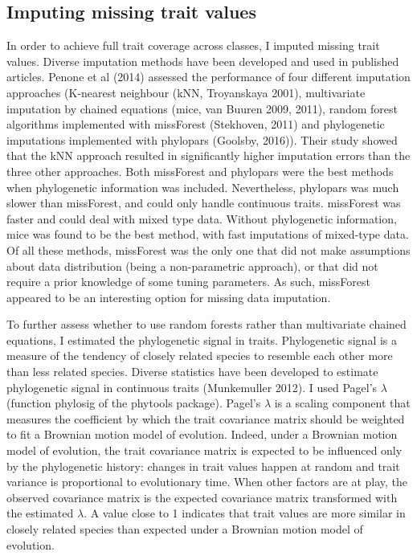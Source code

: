 \subsection{Imputing missing trait values}
In order to achieve full trait coverage across classes, I imputed missing trait values. Diverse imputation methods have been developed and used in published articles. Penone et al (2014) assessed the performance of four different imputation approaches (K-nearest neighbour (kNN, Troyanskaya 2001), multivariate imputation by chained equations (mice, van Buuren 2009, 2011), random forest algorithms implemented with missForest (Stekhoven, 2011) and phylogenetic imputations implemented with phylopars (Goolsby, 2016)). Their study showed that the kNN approach resulted in significantly higher imputation errors than the three other approaches. Both missForest and phylopars were the best methods when phylogenetic information was included. Nevertheless, phylopars was much slower than missForest, and could only handle continuous traits. missForest was faster and could deal with mixed type data. Without phylogenetic information, mice was found to be the best method, with fast imputations of mixed-type data. Of all these methods, missForest was the only one that did not make assumptions about data distribution (being a non-parametric approach), or that did not require a prior knowledge of some tuning parameters. As such, missForest appeared to be an interesting option for missing data imputation.

To further assess whether to use random forests rather than multivariate chained equations, I estimated the phylogenetic signal in traits. Phylogenetic signal is a measure of the tendency of closely related species to resemble each other more than less related species. Diverse statistics have been developed to estimate phylogenetic signal in continuous traits (Munkemuller 2012). I used Pagel's $\lambda$ (function phylosig of the phytools package). Pagel's $\lambda$ is a scaling component that measures the coefficient by which the trait covariance matrix should be weighted to fit a Brownian motion model of evolution. Indeed, under a Brownian motion model of evolution, the trait covariance matrix is expected to be influenced only by the phylogenetic history: changes in trait values happen at random and trait variance is proportional to evolutionary time. When other factors are at play, the observed covariance matrix is the expected covariance matrix transformed with the estimated $\lambda$. A value close to 1 indicates that trait values are more similar in closely related species than expected under a Brownian motion model of evolution. 

